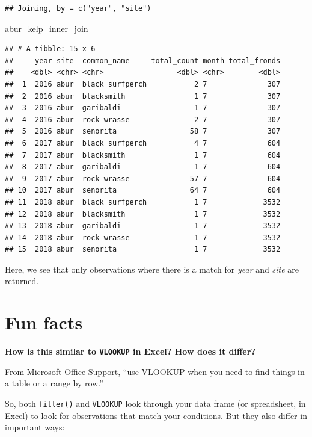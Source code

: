 \documentclass[]{book}
\newenvironment{Shaded}{\begin{snugshade}}{\end{snugshade}}
\newcommand{\NormalTok}[1]{#1}
\begin{document}
\begin{verbatim}
## Joining, by = c("year", "site")
\end{verbatim}

\begin{Shaded}
\begin{Highlighting}[]
\NormalTok{abur_kelp_inner_join}
\end{Highlighting}
\end{Shaded}

\begin{verbatim}
## # A tibble: 15 x 6
##     year site  common_name     total_count month total_fronds
##    <dbl> <chr> <chr>                 <dbl> <chr>        <dbl>
##  1  2016 abur  black surfperch           2 7              307
##  2  2016 abur  blacksmith                1 7              307
##  3  2016 abur  garibaldi                 1 7              307
##  4  2016 abur  rock wrasse               2 7              307
##  5  2016 abur  senorita                 58 7              307
##  6  2017 abur  black surfperch           4 7              604
##  7  2017 abur  blacksmith                1 7              604
##  8  2017 abur  garibaldi                 1 7              604
##  9  2017 abur  rock wrasse              57 7              604
## 10  2017 abur  senorita                 64 7              604
## 11  2018 abur  black surfperch           1 7             3532
## 12  2018 abur  blacksmith                1 7             3532
## 13  2018 abur  garibaldi                 1 7             3532
## 14  2018 abur  rock wrasse               1 7             3532
## 15  2018 abur  senorita                  1 7             3532
\end{verbatim}

Here, we see that only observations where there is a match for \emph{year} and \emph{site} are returned.

\hypertarget{fun-facts}{%
\section{Fun facts}\label{fun-facts}}

\textbf{How is this similar to \texttt{VLOOKUP} in Excel? How does it differ?}

From \href{https://support.office.com/en-us/article/vlookup-function-0bbc8083-26fe-4963-8ab8-93a18ad188a1}{Microsoft Office Support}, ``use VLOOKUP when you need to find things in a table or a range by row.''

So, both \texttt{filter()} and \texttt{VLOOKUP} look through your data frame (or spreadsheet, in Excel) to look for observations that match your conditions. But they also differ in important ways:
\end{document}
